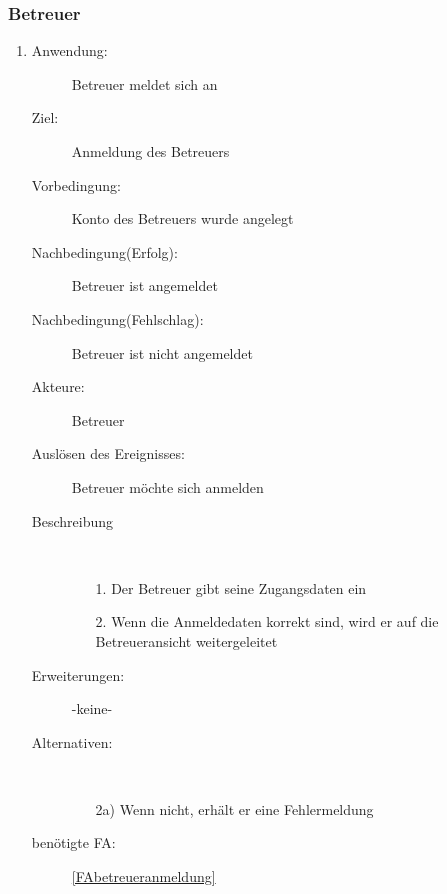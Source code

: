 \documentclass[parskip=full]{scrartcl}
\newcommand{\swtLabel}[1]{\textbf{/#1\arabic*0/}}
\begin{document}
\subsubsection{Betreuer}
\begin{enumerate} [label=\swtLabel{B}]
  \item
	 \begin{description}
		\item[Anwendung:] Betreuer meldet sich an
  		\item[Ziel:] Anmeldung des Betreuers
  		\item[Vorbedingung:] Konto des Betreuers wurde angelegt
  		\item[Nachbedingung(Erfolg):] Betreuer ist angemeldet
  		\item[Nachbedingung(Fehlschlag):] Betreuer ist nicht angemeldet
  		\item[Akteure:] Betreuer
  		\item[Auslösen des Ereignisses:] Betreuer möchte sich anmelden
  		\item[Beschreibung]~
  		\begin{enumerate}
  			\item[1.] Der Betreuer gibt seine Zugangsdaten ein
  			\item[2.] Wenn die Anmeldedaten korrekt sind, wird er auf die
  			Betreueransicht weitergeleitet
  		\end{enumerate}
  		\item[Erweiterungen:] -keine-
  		\item[Alternativen:] ~
  		\begin{enumerate}
  		  \item[2a)] Wenn nicht, erhält er eine Fehlermeldung
  		\end{enumerate}  
  		\item[benötigte FA:] \ref{FAbetreueranmeldung}
  	\end{description}
   

\end{enumerate}
\end{document}
